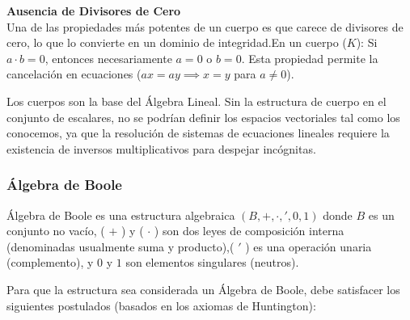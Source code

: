 \documentclass{article}
\begin{document}
 \textbf{Ausencia de Divisores de Cero} \\
 Una de las propiedades más potentes de un cuerpo es que carece de divisores de cero, lo que lo convierte en un dominio de integridad.En un cuerpo ($K$): Si $a \cdot b = 0$, entonces necesariamente $a = 0$ o $b = 0$. Esta propiedad permite la cancelación en ecuaciones ($ax = ay \implies x = y$ para $a \neq 0$).

 Los cuerpos son la base del Álgebra Lineal. Sin la estructura de cuerpo en el conjunto de escalares, no se podrían definir los espacios vectoriales tal como los conocemos, ya que la resolución de sistemas de ecuaciones lineales requiere la existencia de inversos multiplicativos para despejar incógnitas.
 
\subsubsection{Álgebra de Boole}
\label{sec:algebra-de-boole}

Álgebra de Boole es una estructura algebraica $(B, +, \cdot, ', 0, 1)$ donde $B$ es un conjunto no vacío, ( $+$ ) y ( $\cdot$ ) son dos leyes de composición interna (denominadas usualmente suma y producto),( $'$ ) es una operación unaria (complemento), y $0$ y $1$ son elementos singulares (neutros).

Para que la estructura sea considerada un Álgebra de Boole, debe satisfacer los siguientes postulados (basados en los axiomas de Huntington):
\end{document}
